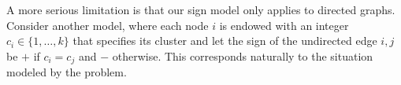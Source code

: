 A more serious limitation is that our sign model only applies to directed graphs. Consider
another model, where each node $i$ is endowed with an integer $c_i \in \{1, \ldots, k\}$ that
specifies its cluster and let the sign of the undirected edge $i,j$ be $+$ if $c_i = c_j$ and $-$
otherwise.  This corresponds naturally to the situation modeled by the \pcc{} problem.
